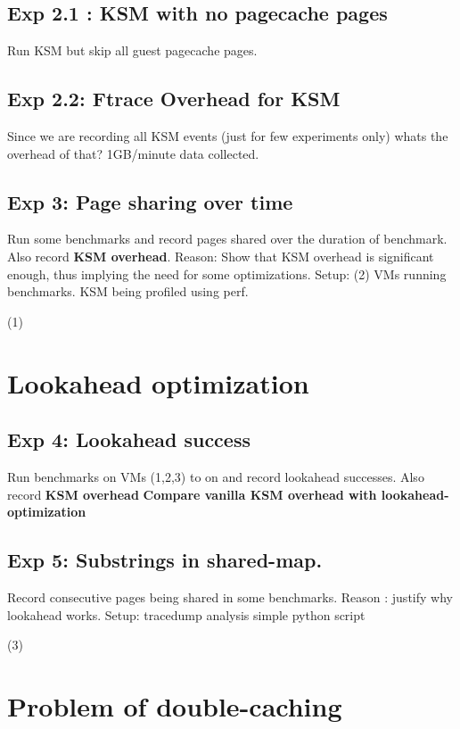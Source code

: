 \documentclass[11pt]{article}
\begin{document}
\subsection{Exp 2.1 : KSM with no pagecache pages}
\label{sec-3_2}

Run KSM but skip all guest pagecache pages.
\subsection{Exp 2.2: Ftrace Overhead for KSM}
\label{sec-3_3}

Since we are recording all KSM events (just for few experiments only) whats the overhead of that?
1GB/minute data collected.
\subsection{Exp 3: Page sharing over time}
\label{sec-3_4}

Run some benchmarks and record pages shared over the duration of benchmark. Also record \textbf{KSM overhead}.
Reason: Show that KSM overhead is significant enough, thus implying the need for some optimizations.
Setup: (2) VMs running benchmarks. KSM being profiled using perf.

(1)
\section{Lookahead optimization}
\label{sec-4}

  
\subsection{Exp 4: Lookahead success}
\label{sec-4_1}

Run benchmarks on VMs (1,2,3) to on and record lookahead successes. Also record \textbf{KSM overhead}
\textbf{Compare vanilla KSM overhead with lookahead-optimization}
\subsection{Exp 5: Substrings in shared-map.}
\label{sec-4_2}

Record consecutive pages being shared in some benchmarks.
Reason : justify why lookahead works.
Setup: tracedump analysis simple python script 

   (3)
\section{Problem of double-caching}
\label{sec-5}
\end{document}
